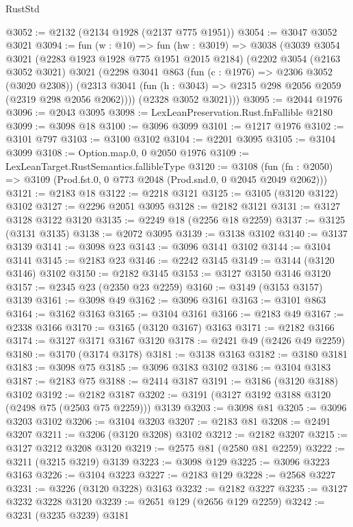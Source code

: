 \begin{lexlean}{RustStd}
\begin{coremodule}
@3052 := @2132 (@2134 @1928 (@2137 @775 @1951))
@3054 := @3047 @3052 @3021
@3094 := fun (w : @10) =>
  fun (hw : @3019) =>
  @3038
    (@3039
      @3054
      @3021
      (@2283 @1923 @1928 @775 @1951 @2015 @2184)
      (@2202
        @3054
        (@2163 @3052 @3021)
        @3021
        (@2298
          @3041
          @863
          (fun (c : @1976) => @2306 @3052 (@3020 @2308))
          (@2313 @3041 (fun (h : @3043) => @2315 @298 @2056 @2059 (@2319 @298 @2056 @2062))))
        (@2328 @3052 @3021)))
@3095 := @2044 @1976
@3096 := @2043 @3095
@3098 := LexLeanPreservation.Rust.fnFallible @2180
@3099 := @3098 @18
@3100 := @3096 @3099
@3101 := @1217 @1976
@3102 := @3101 @797
@3103 := @3100 @3102
@3104 := @2201 @3095
@3105 := @3104 @3099
@3108 := Option.map.{0, 0} @2050 @1976
@3109 := LexLeanTarget.RustSemantics.fallibleType
@3120 := @3108
    (fun (fn : @2050) => @3109 (Prod.fst.{0, 0} @773 @2048 (Prod.snd.{0, 0} @2045 @2049 @2062)))
@3121 := @2183 @18
@3122 := @2218 @3121
@3125 := @3105 (@3120 @3122) @3102
@3127 := @2296 @2051 @3095
@3128 := @2182 @3121
@3131 := @3127 @3128 @3122 @3120
@3135 := @2249 @18 (@2256 @18 @2259)
@3137 := @3125 (@3131 @3135)
@3138 := @2072 @3095
@3139 := @3138 @3102
@3140 := @3137 @3139
@3141 := @3098 @23
@3143 := @3096 @3141 @3102
@3144 := @3104 @3141
@3145 := @2183 @23
@3146 := @2242 @3145
@3149 := @3144 (@3120 @3146) @3102
@3150 := @2182 @3145
@3153 := @3127 @3150 @3146 @3120
@3157 := @2345 @23 (@2350 @23 @2259)
@3160 := @3149 (@3153 @3157) @3139
@3161 := @3098 @49
@3162 := @3096 @3161
@3163 := @3101 @863
@3164 := @3162 @3163
@3165 := @3104 @3161
@3166 := @2183 @49
@3167 := @2338 @3166
@3170 := @3165 (@3120 @3167) @3163
@3171 := @2182 @3166
@3174 := @3127 @3171 @3167 @3120
@3178 := @2421 @49 (@2426 @49 @2259)
@3180 := @3170 (@3174 @3178)
@3181 := @3138 @3163
@3182 := @3180 @3181
@3183 := @3098 @75
@3185 := @3096 @3183 @3102
@3186 := @3104 @3183
@3187 := @2183 @75
@3188 := @2414 @3187
@3191 := @3186 (@3120 @3188) @3102
@3192 := @2182 @3187
@3202 := @3191 (@3127 @3192 @3188 @3120 (@2498 @75 (@2503 @75 @2259))) @3139
@3203 := @3098 @81
@3205 := @3096 @3203 @3102
@3206 := @3104 @3203
@3207 := @2183 @81
@3208 := @2491 @3207
@3211 := @3206 (@3120 @3208) @3102
@3212 := @2182 @3207
@3215 := @3127 @3212 @3208 @3120
@3219 := @2575 @81 (@2580 @81 @2259)
@3222 := @3211 (@3215 @3219) @3139
@3223 := @3098 @129
@3225 := @3096 @3223 @3163
@3226 := @3104 @3223
@3227 := @2183 @129
@3228 := @2568 @3227
@3231 := @3226 (@3120 @3228) @3163
@3232 := @2182 @3227
@3235 := @3127 @3232 @3228 @3120
@3239 := @2651 @129 (@2656 @129 @2259)
@3242 := @3231 (@3235 @3239) @3181

\end{coremodule}
\end{lexlean}

